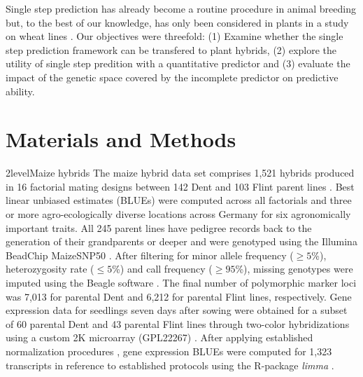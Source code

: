 \documentclass[12pt,titlepage]{article}
\begin{document}
Single step prediction has already become a routine procedure in animal
breeding but, to the best of our knowledge, has only been considered in plants
in a study on wheat lines \cite{Ashraf2016}. 
Our objectives were threefold: (1) Examine whether the single step prediction
framework can be transfered to plant hybrids, (2) explore the utility of single 
step predition with a quantitative predictor and (3) evaluate the impact of the
genetic space covered by the incomplete predictor on predictive ability.










\section{Materials and Methods}
\Genetics2level{Maize hybrids}
The maize hybrid data set comprises 1,521 hybrids produced in 16 factorial
mating designs between 142 Dent and 103 Flint parent lines \cite{Westhues2017}. 
Best linear unbiased estimates (BLUEs) were computed across all factorials and 
three or more agro-ecologically diverse locations across Germany for six 
agronomically important traits.
All 245 parent lines have pedigree records back to the generation of their 
grandparents or deeper \cite{Westhues2017} and were genotyped using the Illumina 
BeadChip MaizeSNP50 \cite{Ganal2011}.
After filtering for minor allele frequency ($\geq 5$\%), heterozygosity rate
($\leq 5$\%) and call frequency ($\geq 95$\%), missing genotypes were imputed 
using the Beagle software \cite{Browning2009}.
The final number of polymorphic marker loci was 7,013 for parental Dent and
6,212 for parental Flint lines, respectively.
Gene expression data for seedlings seven days after sowing were obtained for a 
subset of 60 parental Dent and 43 parental Flint lines through two-color
hybridizations using a custom 2K microarray (GPL22267) \cite{Westhues2017}.
After applying established normalization procedures 
\cite{Smyth2003,Ritchie2007}, gene expression BLUEs were computed for 1,323 
transcripts in reference to established protocols 
\cite{Smyth2003,Ritchie2007,Frisch2010} using the R-package \textit{limma}
\cite{Ritchie2015a}.
\end{document}

